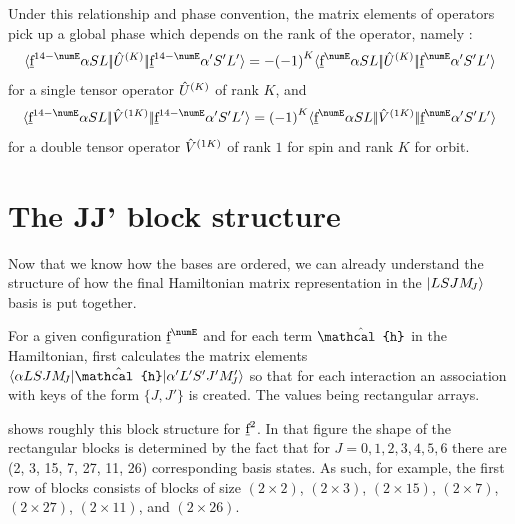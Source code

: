 \documentclass{article}
\begin{document}
Under this relationship and phase convention, the matrix elements of operators pick up a global phase which depends on the rank of the operator, namely \cite{nielson_spectroscopic_1963}:
\begin{equation}
\redbraopket{\forb^{14-\numE}\alpha{SL}}{\op{U}^{(K)}}{\forb^{14-\numE}\alpha'{S'L'}} = -\phaser{K} \redbraopket{\forb^{\numE}\alpha{SL}}{\op{U}^{(K)}}{\forb^{\numE}\alpha'{S'L'}}
\label{eqn:sign change tensor op}
\end{equation}
for a single tensor operator $\hat{U}^{(K)}$ of rank $K$, and
\begin{equation}
\redbraopket{\forb^{14-\numE}\alpha{SL}}{\op{V}^{(1K)}}{\forb^{14-\numE}\alpha'{S'L'}} = \phaser{K} \redbraopket{\forb^{\numE}\alpha{SL}}{\op{V}^{(1K)}}{\forb^{\numE}\alpha'{S'L'}}
\label{eqn:sign change double tensor op}
\end{equation}
for a double tensor operator $\hat{V}^{(1K)}$ of rank $1$ for spin and rank $K$ for orbit.

\section{The JJ' block structure}

Now that we know how the bases are ordered, we can already understand the structure of how the final Hamiltonian matrix representation in the $|LSJM_{\!{J}}\rangle$ basis is put together.

For a given configuration $\forb^\numE$ and for each term $\op{\mathcal{h}}$ in the Hamiltonian, \qlanth first calculates the matrix elements $\braopket{\alpha L S J \Msub{J}}{\op{\mathcal{h}}}{\alpha' L' S' J' \Msub{J}'}$ so that for each interaction an association with keys of the form $\{J, J'\}$ is created. The values being rectangular arrays.

 shows roughly this block structure for $\underbar{$\text{f}$}^2$. In that figure the shape of the rectangular blocks is determined by the fact that for $J=0,1,2,3,4,5,6$ there are (2, 3, 15, 7, 27, 11, 26) corresponding basis states. As such, for example, the first row of blocks consists of blocks of size $(2\times{2})$, $(2\times{3})$, $(2\times{15})$, $(2\times{7})$, $(2\times{27})$, $(2\times{11})$, and $(2\times{26})$.
\end{document}
